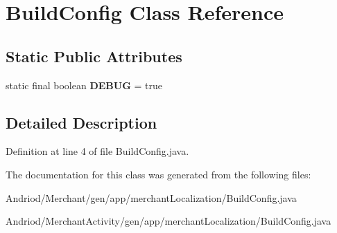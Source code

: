 \hypertarget{classapp_1_1merchant_localization_1_1_build_config}{\section{Build\-Config Class Reference}
\label{classapp_1_1merchant_localization_1_1_build_config}
}
\subsection*{Static Public Attributes}
\begin{DoxyCompactItemize}
\item 
\hypertarget{classapp_1_1merchant_localization_1_1_build_config_a763008768f57e24e91efe192f8b9a02f}{static final boolean {\bfseries D\-E\-B\-U\-G} = true}\label{classapp_1_1merchant_localization_1_1_build_config_a763008768f57e24e91efe192f8b9a02f}

\end{DoxyCompactItemize}


\subsection{Detailed Description}


Definition at line 4 of file Build\-Config.\-java.



The documentation for this class was generated from the following files\-:\begin{DoxyCompactItemize}
\item 
Andriod/\-Merchant/gen/app/merchant\-Localization/Build\-Config.\-java\item 
Andriod/\-Merchant\-Activity/gen/app/merchant\-Localization/Build\-Config.\-java\end{DoxyCompactItemize}
